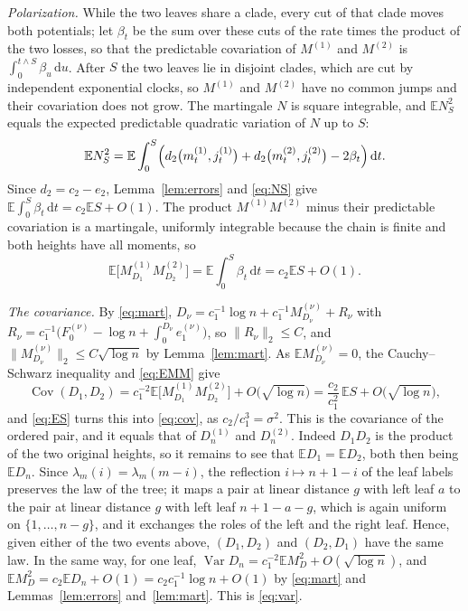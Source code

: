 \documentclass[11pt]{amsart}
\theoremstyle{remark}
\numberwithin{equation}{section}
\newcommand{\E}{\mathbb E}
\newcommand{\Var}{\operatorname{Var}}
\newcommand{\Cov}{\operatorname{Cov}}
\newcommand{\dd}{\,\mathrm d}
\begin{document}
\emph{Polarization.} While the two leaves share a clade, every cut of that clade moves both potentials; let $\beta_t$ be the sum over these cuts of the rate times the product of the two losses, so that the predictable covariation of $M^{(1)}$ and $M^{(2)}$ is $\int_0^{t\wedge S}\beta_u\dd u$. After $S$ the two leaves lie in disjoint clades, which are cut by independent exponential clocks, so $M^{(1)}$ and $M^{(2)}$ have no common jumps and their covariation does not grow. The martingale $N$ is square integrable, and $\E N_S^2$ equals the expected predictable quadratic variation of $N$ up to $S$:
\[
\E N_S^2=\E\int_0^S\Bigl(d_2\bigl(m^{(1)}_t,j^{(1)}_t\bigr)+d_2\bigl(m^{(2)}_t,j^{(2)}_t\bigr)-2\beta_t\Bigr)\dd t .
\]
Since $d_2=c_2-e_2$, Lemma~\ref{lem:errors} and \eqref{eq:NS} give $\E\int_0^S\beta_t\dd t=c_2\E S+O(1)$. The product $M^{(1)}M^{(2)}$ minus their predictable covariation is a martingale, uniformly integrable because the chain is finite and both heights have all moments, so
\begin{equation}\label{eq:EMM}
\E\bigl[M^{(1)}_{D_1}M^{(2)}_{D_2}\bigr]=\E\int_0^S\beta_t\dd t=c_2\E S+O(1).
\end{equation}

\emph{The covariance.} By \eqref{eq:mart}, $D_\nu=c_1^{-1}\log n+c_1^{-1}M^{(\nu)}_{D_\nu}+R_\nu$ with $R_\nu=c_1^{-1}\bigl(F^{(\nu)}_0-\log n+\int_0^{D_\nu}e^{(\nu)}_1\bigr)$, so $\|R_\nu\|_2\le C$, and $\|M^{(\nu)}_{D_\nu}\|_2\le C\sqrt{\log n}$ by Lemma~\ref{lem:mart}. As $\E M^{(\nu)}_{D_\nu}=0$, the Cauchy--Schwarz inequality and \eqref{eq:EMM} give
\begin{equation}\label{eq:covS}
\Cov(D_1,D_2)=c_1^{-2}\E\bigl[M^{(1)}_{D_1}M^{(2)}_{D_2}\bigr]+O\bigl(\sqrt{\log n}\bigr)=\frac{c_2}{c_1^2}\,\E S+O\bigl(\sqrt{\log n}\bigr),
\end{equation}
and \eqref{eq:ES} turns this into \eqref{eq:cov}, as $c_2/c_1^3=\sigma^2$. This is the covariance of the ordered pair, and it equals that of $D^{(1)}_n$ and $D^{(2)}_n$. Indeed $D_1D_2$ is the product of the two original heights, so it remains to see that $\E D_1=\E D_2$, both then being $\E D_n$. Since $\lambda_m(i)=\lambda_m(m-i)$, the reflection $i\mapsto n+1-i$ of the leaf labels preserves the law of the tree; it maps a pair at linear distance $g$ with left leaf $a$ to the pair at linear distance $g$ with left leaf $n+1-a-g$, which is again uniform on $\{1,\dots,n-g\}$, and it exchanges the roles of the left and the right leaf. Hence, given either of the two events above, $(D_1,D_2)$ and $(D_2,D_1)$ have the same law. In the same way, for one leaf, $\Var D_n=c_1^{-2}\E M_D^2+O(\sqrt{\log n})$, and $\E M_D^2=c_2\E D_n+O(1)=c_2c_1^{-1}\log n+O(1)$ by \eqref{eq:mart} and Lemmas~\ref{lem:errors} and~\ref{lem:mart}. This is \eqref{eq:var}.
\end{document}
